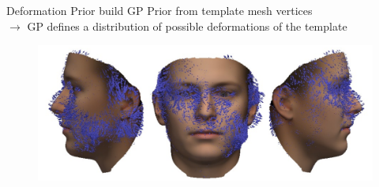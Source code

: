 \documentclass[xcolor=x11names,compress]{beamer}
\begin{document}
\begin{frame}{Deformation Prior}
build GP Prior from template mesh vertices\\
$\rightarrow$ GP defines a distribution of possible deformations of the template 
\begin{figure}
    \centering
\includegraphics[width=.8\textwidth]{../resources/img/prior_deformations.pdf}
\end{figure}
\end{frame}
\end{document}
